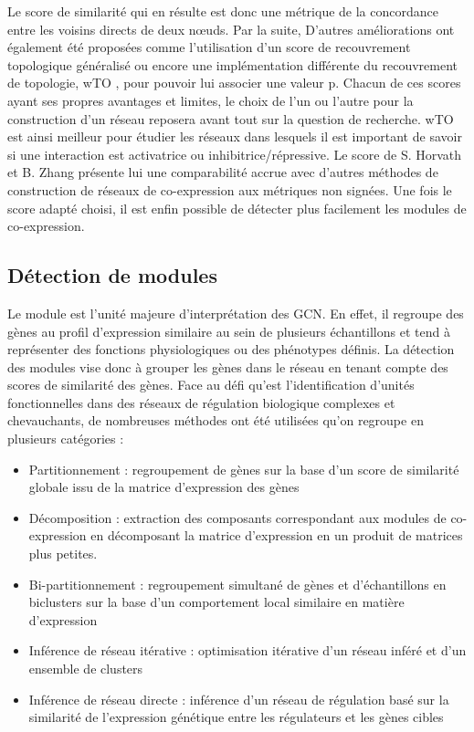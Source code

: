 Le score de similarité qui en résulte est donc une métrique de la concordance entre les voisins directs de deux nœuds. Par la suite, D'autres améliorations ont également été proposées comme l'utilisation d'un score de recouvrement topologique généralisé \cite{Yip2007Dec} ou encore une implémentation différente du recouvrement de topologie, wTO \cite{Gysi2018}, pour pouvoir lui associer une valeur p. Chacun de ces scores ayant ses propres avantages et limites, le choix de l'un ou l'autre pour la construction d'un réseau reposera avant tout sur la question de recherche. wTO est ainsi meilleur pour étudier les réseaux dans lesquels il est important de savoir si une interaction est activatrice ou inhibitrice/répressive. Le score de S. Horvath et B. Zhang présente lui une comparabilité accrue avec d'autres méthodes de construction de réseaux de co-expression aux métriques non signées. Une fois le score adapté choisi, il est enfin possible de détecter plus facilement les modules de co-expression.



\subsection{Détection de modules}


Le module est l'unité majeure d'interprétation des \acrshort{GCN}. En effet, il regroupe des gènes au profil d'expression similaire au sein de plusieurs échantillons et tend à représenter des fonctions physiologiques ou des phénotypes définis. La détection des modules vise donc à grouper les gènes dans le réseau en tenant compte des scores de similarité des gènes. Face au défi qu'est l'identification d'unités fonctionnelles dans des réseaux de régulation biologique complexes et chevauchants, de nombreuses méthodes ont été utilisées qu'on regroupe en plusieurs catégories \cite{Saelens2018} : 
\begin{itemize}
    \item Partitionnement : regroupement de gènes sur la base d'un score de similarité globale issu de la matrice d'expression des gènes
    \item Décomposition : extraction des composants correspondant aux modules de co-expression en décomposant la matrice d'expression en un produit de matrices plus petites.
    \item Bi-partitionnement : regroupement simultané de gènes et d'échantillons en biclusters sur la base d'un comportement local similaire en matière d'expression
    \item Inférence de réseau itérative : optimisation itérative d'un réseau inféré et d'un ensemble de clusters
    \item Inférence de réseau directe : inférence d'un réseau de régulation basé sur la similarité de l'expression génétique entre les régulateurs et les gènes cibles
\end{itemize} 
\hfill

